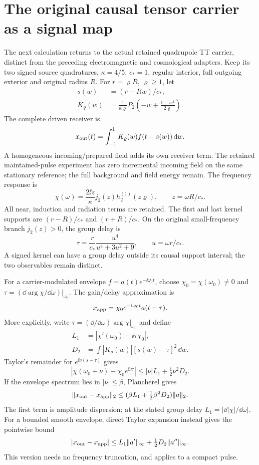 \section{The original causal tensor carrier as a signal map}
The next calculation returns to the actual retained quadrupole TT carrier, distinct from the preceding electromagnetic and cosmological adapters. Keep its two signed source quadratures, $\kappa=4/5$, $c_*=1$, regular interior, full outgoing exterior and original radius $R$. For $r=\varrho R$, $\varrho\ge1$, let
\[
\begin{split}
 s(w)&=(r+Rw)/c_*,\\
 K_{\varrho}(w)&=\frac1{\kappa\varrho}
 P_2\!\left(-w+\frac{1-w^2}{2\varrho}\right).
\end{split}
\]
The complete driven receiver is
\[
 x_{\rm out}(t)=\int_{-1}^{1}K_{\varrho}(w)f(t-s(w))\,\mathrm{d} w.
\]
A homogeneous incoming/prepared field adds its own receiver term. The retained maintained-pulse experiment has zero incremental incoming field on the same stationary reference; the full background and field energy remain. The frequency response is
\[
 \chi(\omega)=\frac{2\ii z}{\kappa}j_2(z)h_2^{(1)}(z\varrho),
 \qquad z=\omega R/c_*.
\]
All near, induction and radiation terms are retained. The first and last kernel supports are $(r-R)/c_*$ and $(r+R)/c_*$. On the original small-frequency branch $j_2(z)>0$, the group delay is
\[
 \tau=\frac r{c_*}
 \frac{u^4}{u^4+3u^2+9},\qquad u=\omega r/c_*.
\]
A signed kernel can have a group delay outside its causal support interval; the two observables remain distinct.

For a carrier-modulated envelope $f=a(t)e^{-\ii\omega_0t}$, choose $\chi_0=\chi(\omega_0)\ne0$ and $\tau=(\dd\arg\chi/\dd\omega)|_{\omega_0}$. The gain/delay approximation is
\[
 x_{\rm app}=\chi_0e^{-\mathrm{i}\omega_0t}a(t-\tau).
\]
More explicitly, write $\tau=(\dd/\dd\omega)\arg\chi|_{\omega_0}$ and define
\[
\begin{split}
 L_1&=|\chi'(\omega_0)-\ii\tau\chi_0|,\\
 D_2&=\int |K_{\varrho}(w)|[s(w)-\tau]^2\,\dd w.
\end{split}
\]
Taylor's remainder for $e^{\ii\nu(s-\tau)}$ gives
\[
 |\chi(\omega_0+\nu)-\chi_0e^{\ii\nu\tau}|
 \le |\nu|L_1+\tfrac12\nu^2D_2.
\]
If the envelope spectrum lies in $|\nu|\le\beta$, Plancherel gives
\[
 \|x_{\rm out}-x_{\rm app}\|_2
 \le(\beta L_1+\tfrac12\beta^2D_2)\|a\|_2.
\]
The first term is amplitude dispersion: at the stated group delay $L_1=|\dd|\chi|/\dd\omega|$. For a bounded smooth envelope, direct Taylor expansion instead gives the pointwise bound
\[
 |x_{\rm out}-x_{\rm app}|
 \le L_1\|a'\|_\infty+\tfrac12D_2\|a''\|_\infty.
\]
This version needs no frequency truncation, and applies to a compact pulse.

